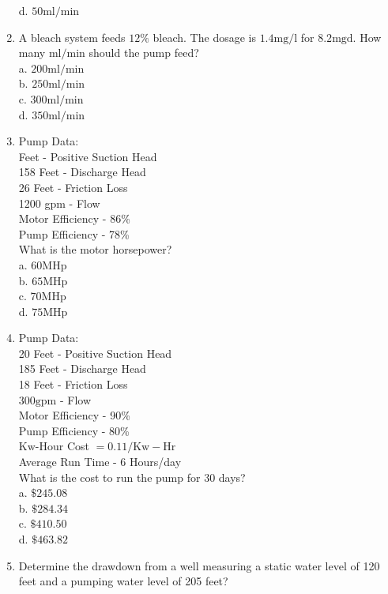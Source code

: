 \begin{enumerate}
d. $50 \mathrm{ml} / \mathrm{min}$\\
\item A bleach system feeds $12 \%$ bleach. The dosage is $1.4 \mathrm{mg} / \mathrm{l}$ for $8.2 \mathrm{mgd}$. How many $\mathrm{ml} / \mathrm{min}$ should the pump feed?\\
a. $200 \mathrm{ml} / \mathrm{min}$\\
b. $250 \mathrm{ml} / \mathrm{min}$\\
c. $300 \mathrm{ml} / \mathrm{min}$\\
d. $350 \mathrm{ml} / \mathrm{min}$\\
\item Pump Data:\\
Feet - Positive Suction Head\\
158 Feet - Discharge Head\\
26 Feet - Friction Loss\\
1200 gpm - Flow\\
Motor Efficiency - 86\%\\
Pump Efficiency - 78\%\\
What is the motor horsepower?\\
a. $60 \mathrm{MHp}$\\
b. $65 \mathrm{MHp}$\\
c. $70 \mathrm{MHp}$\\
d. $75 \mathrm{MHp}$\\
\item Pump Data:\\
20 Feet - Positive Suction Head\\
185 Feet - Discharge Head\\
18 Feet - Friction Loss\\
$300 \mathrm{gpm}$ - Flow\\
Motor Efficiency - 90\%\\
Pump Efficiency - 80\%\\
$\mathrm{Kw}$-Hour Cost $=0.11 / \mathrm{Kw}-\mathrm{Hr}$\\
Average Run Time - 6 Hours/day\\
What is the cost to run the pump for 30 days?\\
a. $\$ 245.08$\\
b. $\$ 284.34$\\
c. $\$ 410.50$\\
d. $\$ 463.82$\\
\item Determine the drawdown from a well measuring a static water level of 120 feet and a pumping water level of 205 feet?\\

\end{enumerate}
